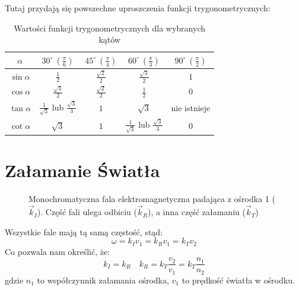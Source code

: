 \documentclass{../notatki}
\begin{document}
Tutaj przydają się powszechne uproszczenia funkcji trygonometrycznych:
\begin{table}[h!]
  \centering
  \renewcommand{\arraystretch}{1.3}
  \begin{tabular}{|c|c|c|c|c|}
    \hline
    $\alpha$ & $30^\circ\ (\frac{\pi}{6})$ &
    $45^\circ\ (\frac{\pi}{4})$ & $60^\circ\ (\frac{\pi}{3})$ &
    $90^\circ\ (\frac{\pi}{2})$ \\
    \hline
    $\sin \alpha$   & $\frac{1}{2}$ & $\frac{\sqrt{2}}{2}$ &
    $\frac{\sqrt{3}}{2}$ & $1$ \\
    \hline
    $\cos \alpha$   & $\frac{\sqrt{3}}{2}$ & $\frac{\sqrt{2}}{2}$ &
    $\frac{1}{2}$ & $0$ \\
    \hline
    $\tan \alpha$   & $\frac{1}{\sqrt{3}}$ lub  $\frac{\sqrt{3}}{3}$
    & $1$ & $\sqrt{3}$ & nie istnieje \\
    \hline
    $\cot \alpha$   & $\sqrt{3}$ & $1$ & $\frac{1}{\sqrt{3}}$ lub
    $\frac{\sqrt{3}}{3}$ & $0$ \\
    \hline
  \end{tabular}
  \caption{Wartości funkcji trygonometrycznych dla wybranych kątów}
\end{table}

\section{Załamanie Światła}

\begin{figure}[h!]
  \centering
  \caption{Monochromatyczna fala elektromagnetyczna padająca z
    ośrodka 1 ($\vec{k}_I$). Część fali ulega odbiciu ($\vec{k}_R$),
    a inna część
  załamaniu ($\vec{k}_T$)}
\end{figure}

Wszystkie fale mają tą samą częstość, stąd:
$$
\omega = k_Iv_1 = k_Rv_1 = k_Tv_2
$$
Co pozwala nam określić, że:
$$
k_I = k_R \quad k_R = k_T \frac{v_2}{v_1} = k_T \frac{n_1}{n_2}
$$
gdzie $n_1$ to współczynnik załamania ośrodka, $v_1$ to prędkość
światła w ośrodku.
\end{document}
